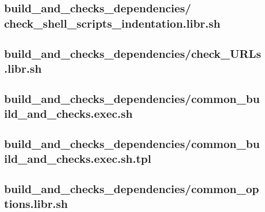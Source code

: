 \documentclass{article}
\begin{document}


\subsection{
  build\_and\_checks\_dependencies/%
check\_shell\_scripts\_indentation.libr.sh
}
\label{
  build_and_checks_dependencies:check_shell_scripts_indentationlibrsh
}



\subsection{
  build\_and\_checks\_dependencies/check\_URLs.libr.sh
}
\label{
  build_and_checks_dependencies:check_URLslibrsh
}



\subsection{
  build\_and\_checks\_dependencies/common\_build\_and\_checks.exec.sh
}
\label{
  build_and_checks_dependencies:common_build_and_checksexecsh
}



\subsection{
  build\_and\_checks\_dependencies/common\_build\_and\_checks.exec.sh.tpl
}
\label{
  build_and_checks_dependencies:common_build_and_checksexecshtpl
}



\subsection{
  build\_and\_checks\_dependencies/common\_options.libr.sh
}
\label{
  build_and_checks_dependencies:common_optionslibrsh
}

\end{document}
